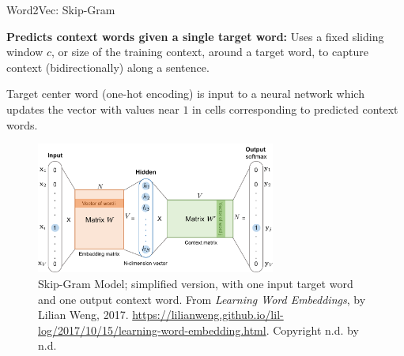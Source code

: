 \begin{frame}{Word2Vec: Skip-Gram}\label{SkipGram}
    
    \begin{itemizeSpaced}{2pt}
        \pinkbox  \textbf{Predicts context words given a single target word: } Uses a fixed sliding window $c$, or size of the training context, around a target word, to capture context (bidirectionally) along a sentence. 
        
        \item Target center word (one-hot encoding) is input to a neural network which updates the vector with values near $1$ in cells corresponding to predicted context words.
        
    \end{itemizeSpaced}
    
    
    \begin{figure}[h]
    \vspace{-25pt}
    \centering
    \includegraphics[width=0.7\textwidth]{imgs/skipgram_image.png}
    \vspace{-5pt}
    \caption{\tiny Skip-Gram Model; simplified version, with one input target word and one output context word. From \emph{Learning Word Embeddings}, by Lilian Weng, 2017. \url{https://lilianweng.github.io/lil-log/2017/10/15/learning-word-embedding.html}. Copyright n.d. by n.d.}
    \label{fig:SkipGram}
    \vspace{-25pt}
    \end{figure}
    
\end{frame}


